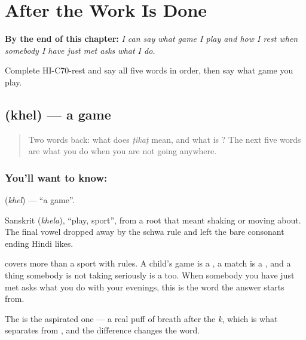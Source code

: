 
\chapter{After the Work Is Done}
\label{ch:hi-after-the-work-is-done}

\begin{chapteropening}
\textbf{By the end of this chapter:} \emph{I can say what game I play and how I rest when somebody I have just met asks what I do.}

Complete HI-C70-rest and say all five words in order, then say what game you play.
\end{chapteropening}

\section[\texorpdfstring{\hi{खेल} (khel)}{खेल (khel)}]{ (khel) — a game}

\label{lesson:HI-C70-game}



\begin{quote}
Two words back: what does \emph{ṭikaṭ} mean, and what is \textbf{}? The next five words are what you do when you are not going anywhere.
\end{quote}

\subsection*{You'll want to know: }
\textbf{} (\emph{khel}) — \textquotedblleft{}a game\textquotedblright{}.

Sanskrit  (\emph{khela}), \textquotedblleft{}play, sport\textquotedblright{}, from a root that meant shaking or moving about. The final vowel dropped away by the schwa rule and left the bare consonant ending Hindi likes.

 covers more than a sport with rules. A child's game is a , a match is a , and a thing somebody is not taking seriously is a  too. When somebody you have just met asks what you do with your evenings, this is the word the answer starts from.

The \textbf{} is the aspirated one — a real puff of breath after the \emph{k}, which is what separates  from , and the difference changes the word.

